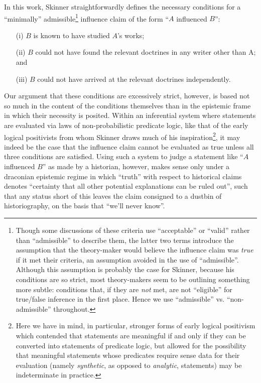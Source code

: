 \documentclass[11pt]{article}
\begin{document}
In this work, Skinner straightforwardly defines the necessary conditions for a ``minimally'' admissible\footnote{Though some discussions of these criteria use ``acceptable'' or ``valid'' rather than ``admissible'' to describe them, the latter two terms introduce the assumption that the theory-maker would believe the influence claim was \textit{true} if it met their criteria, an assumption avoided in the use of ``admissible''. Although this assumption is probably the case for Skinner, because his conditions are so strict, most theory-makers seem to be outlining something more subtle: conditions that, if they are \textit{not} met, are not ``eligible'' for true/false inference in the first place. Hence we use ``admissible'' vs. ``non-admissible'' throughout.} influence claim of the form ``$A$ influenced $B$'':
\begin{itemize}
	\item[(i)] $B$ is known to have studied $A$'s works;
	\item[(ii)] $B$ could not have found the relevant doctrines in any writer other than A; and 
	\item[(iii)] $B$ could not have arrived at the relevant doctrines independently.
\end{itemize}
Our argument that these conditions are excessively strict, however, is based not so much in the content of the conditions themselves than in the epistemic frame in which their necessity is posited. Within an inferential system where statements are evaluated via laws of non-probabilistic predicate logic, like that of the early logical positivists from whom Skinner draws much of his inspiration\footnote{Here we have in mind, in particular, stronger forms of early logical positivism which contended that statements are meaningful if and only if they can be converted into statements of predicate logic, but allowed for the possibility that meaningful statements whose predicates require sense data for their evaluation (namely \textit{synthetic}, as opposed to \textit{analytic}, statements) may be indeterminate in practice.}, it may indeed be the case that the influence claim cannot be evaluated as true unless all three conditions are satisfied. Using such a system to judge a statement like ``$A$ influenced $B$'' as made by a historian, however, makes sense only under a draconian epistemic regime in which ``truth'' with respect to historical claims denotes ``certainty that all other potential explanations can be ruled out'', such that any status short of this leaves the claim consigned to a dustbin of historiography, on the basis that ``we'll never know''.
\end{document}
